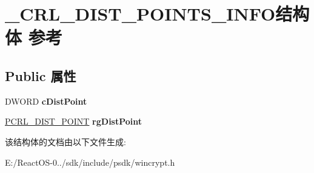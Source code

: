 \hypertarget{struct___c_r_l___d_i_s_t___p_o_i_n_t_s___i_n_f_o}{}\section{\+\_\+\+C\+R\+L\+\_\+\+D\+I\+S\+T\+\_\+\+P\+O\+I\+N\+T\+S\+\_\+\+I\+N\+F\+O结构体 参考}
\label{struct___c_r_l___d_i_s_t___p_o_i_n_t_s___i_n_f_o}
\subsection*{Public 属性}
\begin{DoxyCompactItemize}
\item 
\mbox{\label{struct___c_r_l___d_i_s_t___p_o_i_n_t_s___i_n_f_o_adda3df800a871916c3c6bc7eae769981}} 
D\+W\+O\+RD {\bfseries c\+Dist\+Point}
\item 
\mbox{\label{struct___c_r_l___d_i_s_t___p_o_i_n_t_s___i_n_f_o_a450e966e9046fe4d375cb8e3687323a0}} 
\hyperlink{struct___c_r_l___d_i_s_t___p_o_i_n_t}{P\+C\+R\+L\+\_\+\+D\+I\+S\+T\+\_\+\+P\+O\+I\+NT} {\bfseries rg\+Dist\+Point}
\end{DoxyCompactItemize}


该结构体的文档由以下文件生成\+:\begin{DoxyCompactItemize}
\item 
E\+:/\+React\+O\+S-\/0../sdk/include/psdk/wincrypt.\+h\end{DoxyCompactItemize}
